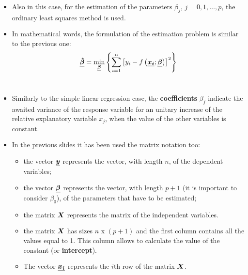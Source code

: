 \begin{frame}
  \vspace{0.25cm}
  \begin{itemize}
    \item Also in this case, for the estimation of the parameters $ \beta_j $, $ j = 0, 1, \dots, p $, the ordinary least squares method is used.
    \vspace{0.5cm}
    \item In mathematical words, the formulation of the estimation problem is similar to the previous one:
    \vspace{-0.3cm} $$\boldsymbol{\underline{\hat{\beta}}} = \min_{\boldsymbol{\underline{\beta}}}\left\lbrace \sum_{i=1}^{n}{\left[ y_i - f\left( \boldsymbol{\underline{x_i}}; \boldsymbol{\underline{\beta}} \right) \right]^2 }\right\rbrace $$\\
    \vspace{0.4cm}
    \item Similarly to the simple linear regression case, the \textbf{coefficients} $ \beta_j $ indicate the awaited variance of the response variable for an unitary increase of the relative explanatory variable $ x_j $, when the value of the other variables is constant.
  \end{itemize}
\end{frame}

\begin{frame}
  \vspace{0.25cm}
  \begin{itemize}
    \item In the previous slides it has been used the matrix notation too:
    \vspace{0.25cm}
    \begin{itemize}
      \item the vector $ \boldsymbol{\underline{y}} $ represents the vector, with length $ n $, of the dependent variables;
      \vspace{0.25cm}
      \item the vector $ \boldsymbol{\underline{\beta}} $ represents the vector, with length $ p + 1 $ (it is important to consider $ \beta_0 $), of the parameters that have to be estimated;
      \vspace{0.25cm}
      \item the matrix $ \boldsymbol{X} $ represents the matrix of the independent variables. 
      \vspace{0.25cm}
      \item the matrix $ \boldsymbol{X} $ has sizes $ n $ x $ (p + 1) $ and the first column contains all the values equal to 1. This column allows to calculate the value of the constant (or \textbf{intercept}).
      \vspace{0.25cm}
      \item The vector $ \boldsymbol{\underline{x_i}} $ represents the $ i $th row of the matrix $ \boldsymbol{X} $.
    \end{itemize}
  \end{itemize}
\end{frame}

